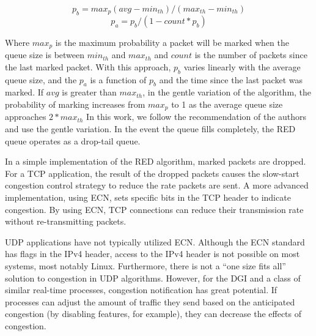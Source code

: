 \begin{equation}
p_{b} = max_p (avg - min_{th}) / (max_{th}-min_{th})
\end{equation}
\begin{equation}
p_{a} = p_{b} / (1-count * p_b)
\end{equation}

Where $max_p$ is the maximum probability a packet will be marked when the queue size is between $min_{th}$ and $max_{th}$ and $count$ is the number of packets since the last marked packet.
With this approach, $p_{b}$ varies linearly with the average queue size, and the $p_{a}$ is a function of $p_{b}$ and the time since the last packet was marked.
If $avg$ is greater than $max_{th}$, in the gentle variation of the algorithm, the probability of marking increases from $max_p$ to 1 as the average queue size approaches $2*max_{th}$
In this work, we follow the recommendation of the authors and use the gentle variation.
In the event the queue fills completely, the \ac{RED} queue operates as a drop-tail queue.

In a simple implementation of the \ac{RED} algorithm, marked packets are dropped.
For a TCP application, the result of the dropped packets causes the slow-start congestion control strategy to reduce the rate packets are sent.
A more advanced implementation, using \ac{ECN}, sets specific bits in the TCP header to indicate congestion.
By using \ac{ECN}, TCP connections can reduce their transmission rate without re-transmitting packets.

UDP applications have not typically utilized \ac{ECN}.
Although the \ac{ECN} standard has flags in the IPv4 header, access to the IPv4 header is not possible on most systems, most notably Linux.
Furthermore, there is not a ``one size fits all'' solution to congestion in UDP algorithms.
However, for the \ac{DGI} and a class of similar real-time processes, congestion notification has great potential.
If processes can adjust the amount of traffic they send based on the anticipated congestion (by disabling features, for example), they can decrease the effects of congestion.

